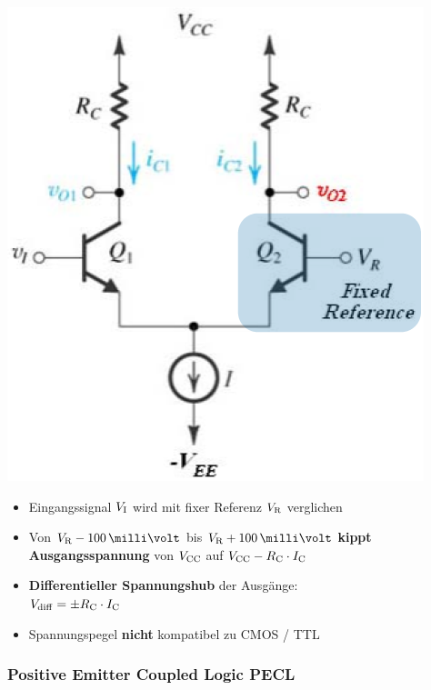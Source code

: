 \begin{minipage}[c]{0.25\columnwidth}
    \includegraphics[width=\columnwidth]{images/ECL.png}
\end{minipage}
\hfill
\begin{minipage}[c]{0.72\columnwidth}
   \begin{itemize}
    \item Eingangssignal $V_{\rm I}$ wird mit fixer Referenz $V_{\rm R}$ verglichen
    \item Von $V_{\rm R} - 100 \, \milli \volt$ bis $V_{\rm R} + 100 \, \milli \volt$ \textbf{kippt Ausgangsspannung} von $V_{\rm CC}$ auf $V_{\rm CC} - R_{\rm C} \cdot I_{\rm C}$
    \item \textbf{Differentieller Spannungshub} der Ausgänge:\\ $V_{\rm diff} = \pm R_{\rm C} \cdot I_{\rm C}$
    \item Spannungspegel \textbf{nicht} kompatibel zu CMOS / TTL
   \end{itemize}
\end{minipage}


\subsubsection{Positive Emitter Coupled Logic PECL}

